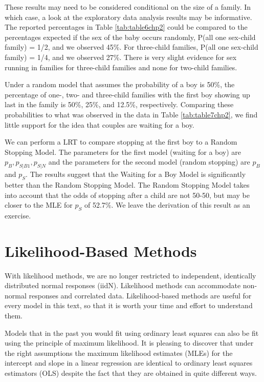 \documentclass[
]{krantz}
\newcommand{\bstop}{p_{S|B1}}
\newcommand{\nstop}{p_{S|N}}
\begin{document}
These results may need to be considered conditional on the size of a family. In which case, a look at the exploratory data analysis results may be informative. The reported percentages in Table \ref{tab:table6chp2} could be compared to the percentages expected if the sex of the baby occurs randomly, P(all one sex-child family) = 1/2, and we observed 45\%. For three-child families, P(all one sex-child family) = 1/4, and we observed 27\%. There is very slight evidence for sex running in families for three-child families and none for two-child families.

Under a random model that assumes the probability of a boy is 50\%, the percentage of one-, two- and three-child families with the first boy showing up last in the family is 50\%, 25\%, and 12.5\%, respectively. Comparing these probabilities to what was observed in the data in Table \ref{tab:table7chp2}, we find little support for the idea that couples are waiting for a boy.

We can perform a LRT to compare stopping at the first boy to a Random Stopping Model. The parameters for the first model (waiting for a boy) are \(p_B, \bstop, \nstop\) and the parameters for the second model (random stopping) are \(p_B\) and \(p_S\). The results suggest that the Waiting for a Boy Model is significantly better than the Random Stopping Model. The Random Stopping Model takes into account that the odds of stopping after a child are not 50-50, but may be closer to the MLE for \(p_S\) of 52.7\%. We leave the derivation of this result as an exercise.

\section{Likelihood-Based Methods}\label{likelihood-based-methods}

With likelihood methods, we are no longer restricted to independent, identically distributed normal responses (iidN). Likelihood methods can accommodate non-normal responses and correlated data. Likelihood-based methods are useful for every model in this text, so that it is worth your time and effort to understand them.

Models that in the past you would fit using ordinary least squares can also be fit using the principle of maximum likelihood. It is pleasing to discover that under the right assumptions the maximum likelihood estimates (MLEs) for the intercept and slope in a linear regression are identical to ordinary least squares estimators (OLS) despite the fact that they are obtained in quite different ways.
\end{document}
